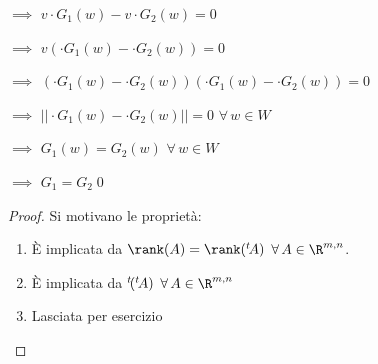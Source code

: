 {\begin{itemize}
            $\implies$ $ v \cdot  G_1(w) - v \cdot G_2(w) =0 $ 
            
            $\implies$ $ v (\cdot  G_1(w) - \cdot G_2(w))=0 $ 
            
            $\implies$ $ (\cdot  G_1(w) - \cdot G_2(w))(\cdot  G_1(w) - \cdot G_2(w))=0 $ 
            
            $\implies$ $ ||\cdot  G_1(w) - \cdot G_2(w)||=0 $ $ \forall\, w \in W $ 
            
            $\implies$ $ G_1(w)=G_2(w) $ $ \forall\, w \in W $ 
            
            $\implies$ $ G_1 = G_2$\qed
    \end{itemize}
}

\begin{proof}
    Si motivano le proprietà:
    \begin{enumerate}
        \item È implicata da $ \rank (A) =\rank (\null^{t}\!A) $ $ \forall\, A \in \R^{m,n} $.
        \item È implicata da $ \null^{t}\!(\null^{t}\!A) $ $ \forall\, A \in \R^{m,n} $
        \item Lasciata per esercizio \qedhere%
    \end{enumerate}
\end{proof}


